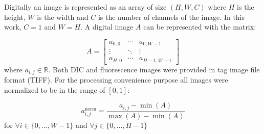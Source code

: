 Digitally an image is represented as an array of size $(H, W, C)$ where $H$ is the height, $W$ is the width and $C$ is the number of channels of the image. In this work, $C = 1$ and $W = H$. A digital image $A$ can be    represented with the matrix:

\begin{equation}
    A = \left[
            \begin{array}{ccc}
                a_{0,0} & \cdots & a_{0,W-1} \\
                \vdots & \ddots & \vdots \\
                a_{H, 0} & \cdots & a_{H-1, W-1}
            \end{array}
        \right]
\end{equation}
where $a_{i, j} \in \mathbb{R}$. Both DIC and fluorescence images were provided in tag image file format (TIFF). For the processing convenience purpose all images were normalized to be in the range of $[0, 1]$:

\begin{equation}
    a^{\text{norm}}_{i,j} = \frac{a_{i, j} - \min(A)}{\max(A) - \min(A)}
\end{equation}
for $ \forall i \in \{0, ..., W - 1\}$ and $ \forall j \in \{0, ..., H - 1\}$